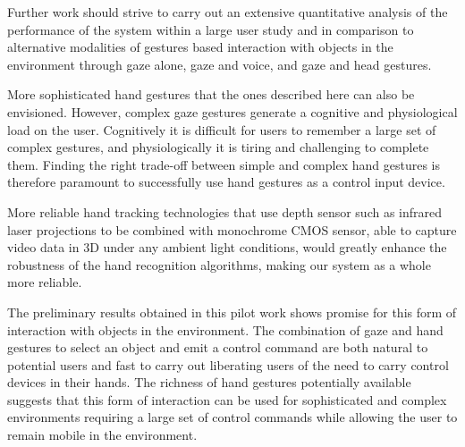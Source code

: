 \documentclass[jou,a4paper,notxfonts]{apa}
\begin{document}
Further work should strive to carry out an extensive quantitative analysis of the performance of the system within a
large user study and in comparison to alternative modalities of gestures based interaction with objects in the environment through gaze alone, gaze and voice, and gaze and head gestures. 


More sophisticated hand gestures that the ones described here can also be envisioned. However, complex gaze gestures generate a
cognitive and physiological load on the user. Cognitively it is difficult for users to remember a large set of complex
gestures, and physiologically it is tiring and challenging to complete them. Finding the right trade-off between simple
and complex hand gestures is therefore paramount to successfully use hand gestures as a control input device.

More reliable hand tracking technologies that use depth sensor such as  infrared laser projections to be combined with monochrome CMOS sensor, able to capture video data in 3D under any ambient light conditions, would greatly enhance the robustness of the hand recognition algorithms, making our system as a whole more reliable.


The preliminary results obtained  in this pilot work shows promise for this form of interaction with objects in the
environment. The combination of gaze and hand gestures to select an object  and emit a control command are both natural 
to potential users and fast to carry out liberating users of the need to carry control devices in their hands. The richness of hand gestures potentially available suggests that this form of interaction can be used for sophisticated and complex environments requiring  a large set of control commands while allowing the user to remain mobile in the environment.





\end{document}

